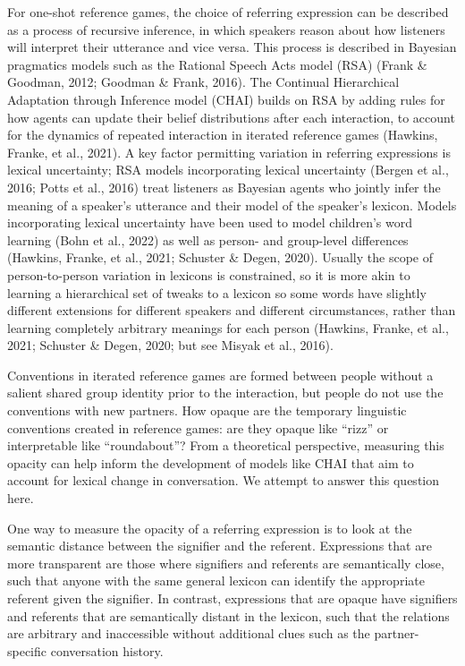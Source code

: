\documentclass[10pt, letterpaper]{article}
\begin{document}
For one-shot reference games, the choice of referring expression can be
described as a process of recursive inference, in which speakers reason
about how listeners will interpret their utterance and vice versa. This
process is described in Bayesian pragmatics models such as the Rational
Speech Acts model (RSA) (Frank \& Goodman, 2012; Goodman \& Frank,
2016). The Continual Hierarchical Adaptation through Inference model
(CHAI) builds on RSA by adding rules for how agents can update their
belief distributions after each interaction, to account for the dynamics
of repeated interaction in iterated reference games (Hawkins, Franke, et
al., 2021). A key factor permitting variation in referring expressions
is lexical uncertainty; RSA models incorporating lexical uncertainty
(Bergen et al., 2016; Potts et al., 2016) treat listeners as Bayesian
agents who jointly infer the meaning of a speaker's utterance and their
model of the speaker's lexicon. Models incorporating lexical uncertainty
have been used to model children's word learning (Bohn et al., 2022) as
well as person- and group-level differences (Hawkins, Franke, et al.,
2021; Schuster \& Degen, 2020). Usually the scope of person-to-person
variation in lexicons is constrained, so it is more akin to learning a
hierarchical set of tweaks to a lexicon so some words have slightly
different extensions for different speakers and different circumstances,
rather than learning completely arbitrary meanings for each person
(Hawkins, Franke, et al., 2021; Schuster \& Degen, 2020; but see Misyak
et al., 2016).

Conventions in iterated reference games are formed between people
without a salient shared group identity prior to the interaction, but
people do not use the conventions with new partners. How opaque are the
temporary linguistic conventions created in reference games: are they
opaque like ``rizz'' or interpretable like ``roundabout''? From a
theoretical perspective, measuring this opacity can help inform the
development of models like CHAI that aim to account for lexical change
in conversation. We attempt to answer this question here.

One way to measure the opacity of a referring expression is to look at
the semantic distance between the signifier and the referent.
Expressions that are more transparent are those where signifiers and
referents are semantically close, such that anyone with the same general
lexicon can identify the appropriate referent given the signifier. In
contrast, expressions that are opaque have signifiers and referents that
are semantically distant in the lexicon, such that the relations are
arbitrary and inaccessible without additional clues such as the
partner-specific conversation history.
\end{document}
